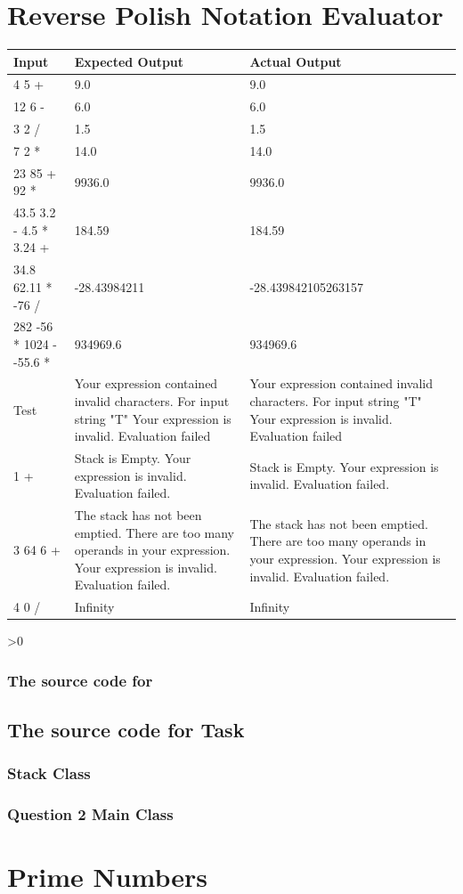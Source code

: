 \documentclass[12pt,a4paper,onesided]{report}
\newcommand{\source}{\pagebreak
	\ifnum\value{section}>0
		\subsection{The source code for \thesection}

	\else
		\section{The source code for Task \thechapter}

	\fi
	}
\begin{document}
\chapter{Reverse Polish Notation Evaluator}
\begin{table}[h!]
	\centering
\begin{tabular}{lp{28ex}p{28ex}}
	\toprule Input & Expected Output & Actual Output\\
	\midrule
	4 5 + & 9.0 & 9.0\\
	12 6 - & 6.0 & 6.0\\
	3 2 / & 1.5 & 1.5 \\
	7 2 * & 14.0 & 14.0\\
	23 85 + 92 * & 9936.0 & 9936.0 \\
	43.5 3.2 - 4.5 * 3.24 + & 184.59 & 184.59 \\
	34.8 62.11 * -76 / & -28.43984211 & -28.439842105263157\\
	282 -56 * 1024 - -55.6 * & 934969.6 & 934969.6\\
	Test & Your expression contained invalid characters. For input string "T" Your expression is invalid. Evaluation failed& Your expression contained invalid characters. For input string "T" Your expression is invalid. Evaluation failed\\ 
	1 + & Stack is Empty. Your expression is invalid. Evaluation failed. &  Stack is Empty. Your expression is invalid. Evaluation failed.\\
	3 64 6 + & The stack has not been emptied. There are too many operands in your expression. Your expression is invalid. Evaluation failed. & The stack has not been emptied. There are too many operands in your expression. Your expression is invalid. Evaluation failed. \\
	4 0 / & Infinity & Infinity \\
	\bottomrule
\end{tabular}
\end{table}
\source
\subsection{Stack Class}

\subsection{Question 2 Main Class}

\chapter{Prime Numbers}
\end{document}
